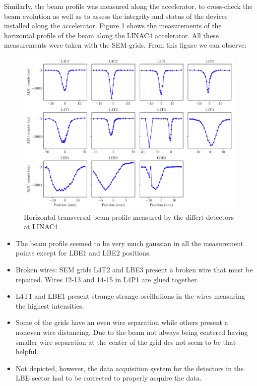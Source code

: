 Similarly, the beam profile was measured along the accelerator, to cross-check the beam evolution as well as to assess the integrity and status of the devices installed along the accelerator.  Figure \ref{fig:HorizontalProf} shows the measurements of the horizontal profile of the beam along the LINAC4 accelerator. All these measurements were taken with the SEM grids. From this figure we can observe:

\begin{figure}
    \centering
    \includegraphics[width=1.0\columnwidth]{SigmaEvol/HorEvol.pdf}
    \caption{Horizontal transversal beam profile measured by the differt detectors at LINAC4}
    \label{fig:HorizontalProf}
\end{figure}

\begin{itemize}
    \item The beam profile seemed to be very much gaussian in all the measurement points except for LBE1 and LBE2 positions.
    \item Broken wires: SEM grids L4T2 and LBE3 present a broken wire that must be repaired. Wires 12-13 and 14-15 in L4P1 are glued together. 
    \item L4T1 and LBE1 present strange strange oscillations in the wires measuring the highest intensities. 
    \item Some of the grids have an even wire separation while others present a noneven wire distancing. Due to the beam not always being centered having smaller wire separation at the center of the grid des not seem to be that helpful.
    \item Not depicted, however, the data acquisition system for the detectors in the LBE sector had to be corrected to properly acquire the data.
\end{itemize}





